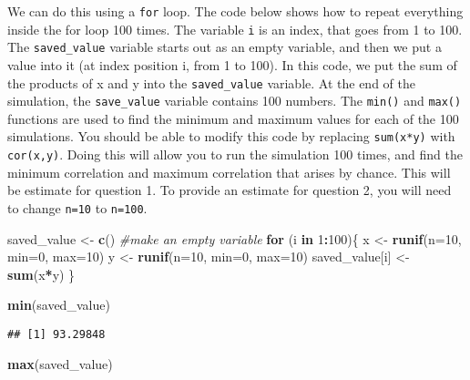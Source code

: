 \documentclass[
]{book}
\newenvironment{Shaded}{\begin{snugshade}}{\end{snugshade}}
\newcommand{\AttributeTok}[1]{\textcolor[rgb]{0.13,0.29,0.53}{#1}}
\newcommand{\CommentTok}[1]{\textcolor[rgb]{0.56,0.35,0.01}{\textit{#1}}}
\newcommand{\ControlFlowTok}[1]{\textcolor[rgb]{0.13,0.29,0.53}{\textbf{#1}}}
\newcommand{\DecValTok}[1]{\textcolor[rgb]{0.00,0.00,0.81}{#1}}
\newcommand{\FunctionTok}[1]{\textcolor[rgb]{0.13,0.29,0.53}{\textbf{#1}}}
\newcommand{\NormalTok}[1]{#1}
\newcommand{\OtherTok}[1]{\textcolor[rgb]{0.56,0.35,0.01}{#1}}
\newcommand{\SpecialCharTok}[1]{\textcolor[rgb]{0.81,0.36,0.00}{\textbf{#1}}}
\begin{document}
We can do this using a \texttt{for} loop. The code below shows how to repeat everything inside the for loop 100 times. The variable \texttt{i} is an index, that goes from 1 to 100. The \texttt{saved\_value} variable starts out as an empty variable, and then we put a value into it (at index position i, from 1 to 100). In this code, we put the sum of the products of x and y into the \texttt{saved\_value} variable. At the end of the simulation, the \texttt{save\_value} variable contains 100 numbers. The \texttt{min()} and \texttt{max()} functions are used to find the minimum and maximum values for each of the 100 simulations. You should be able to modify this code by replacing \texttt{sum(x*y)} with \texttt{cor(x,y)}. Doing this will allow you to run the simulation 100 times, and find the minimum correlation and maximum correlation that arises by chance. This will be estimate for question 1. To provide an estimate for question 2, you will need to change \texttt{n=10} to \texttt{n=100}.

\begin{Shaded}
\begin{Highlighting}[]
\NormalTok{saved\_value }\OtherTok{\textless{}{-}} \FunctionTok{c}\NormalTok{() }\CommentTok{\#make an empty variable}
\ControlFlowTok{for}\NormalTok{ (i }\ControlFlowTok{in} \DecValTok{1}\SpecialCharTok{:}\DecValTok{100}\NormalTok{)\{}
\NormalTok{  x }\OtherTok{\textless{}{-}} \FunctionTok{runif}\NormalTok{(}\AttributeTok{n=}\DecValTok{10}\NormalTok{, }\AttributeTok{min=}\DecValTok{0}\NormalTok{, }\AttributeTok{max=}\DecValTok{10}\NormalTok{)}
\NormalTok{  y }\OtherTok{\textless{}{-}} \FunctionTok{runif}\NormalTok{(}\AttributeTok{n=}\DecValTok{10}\NormalTok{, }\AttributeTok{min=}\DecValTok{0}\NormalTok{, }\AttributeTok{max=}\DecValTok{10}\NormalTok{)}
\NormalTok{  saved\_value[i] }\OtherTok{\textless{}{-}} \FunctionTok{sum}\NormalTok{(x}\SpecialCharTok{*}\NormalTok{y)}
\NormalTok{\}}

\FunctionTok{min}\NormalTok{(saved\_value)}
\end{Highlighting}
\end{Shaded}

\begin{verbatim}
## [1] 93.29848
\end{verbatim}

\begin{Shaded}
\begin{Highlighting}[]
\FunctionTok{max}\NormalTok{(saved\_value)}
\end{Highlighting}
\end{Shaded}
\end{document}
